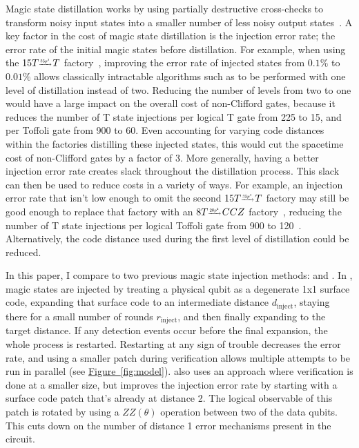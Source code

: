 \documentclass[onecolumn,unpublished,a4paper]{quantumarticle}
\theoremstyle{definition}
\theoremstyle{definition}
\theoremstyle{definition}
\newcommand{\fig}[1]{\hyperref[fig:#1]{Figure~\ref*{fig:#1}}}
\begin{document}
Magic state distillation works by using partially destructive cross-checks to transform noisy input states into a smaller number of less noisy output states~\cite{bravyi2005distillation}.
A key factor in the cost of magic state distillation is the injection error rate; the error rate of the initial magic states before distillation.
For example, when using the $15T \resizebox{!}{8pt}{$\xrightarrow{35p^3}$\,} T$ factory~\cite{bravyi2005distillation}, improving the error rate of injected states from $0.1\%$ to $0.01\%$ allows classically intractable algorithms such as \cite{lee2021hypercontraction,gidney2021factor,soeken2020improved} to be performed with one level of distillation instead of two.
Reducing the number of levels from two to one would have a large impact on the overall cost of non-Clifford gates, because it reduces the number of T state injections per logical T gate from 225 to 15, and per Toffoli gate from 900 to 60.
Even accounting for varying code distances within the factories distilling these injected states, this would cut the spacetime cost of non-Clifford gates by a factor of 3.
More generally, having a better injection error rate creates slack throughout the distillation process.
This slack can then be used to reduce costs in a variety of ways.
For example, an injection error rate that isn't low enough to omit the second $15T \resizebox{!}{8pt}{$\xrightarrow{35p^3}$\,} T$ factory may still be good enough to replace that factory with an $8T \resizebox{!}{8pt}{$\xrightarrow{28p^2}$\,} CCZ$ factory~\cite{jones2013}, reducing the number of T state injections per logical Toffoli gate from 900 to 120~\cite{gidney2019catalyzeddistillation}.
Alternatively, the code distance used during the first level of distillation could be reduced.

In this paper, I compare to two previous magic state injection methods: \cite{li2015injection} and \cite{singh2022injection}.
In \cite{li2015injection}, magic states are injected by treating a physical qubit as a degenerate 1x1 surface code, expanding that surface code to an intermediate distance $d_\text{inject}$, staying there for a small number of rounds $r_\text{inject}$, and then finally expanding to the target distance.
If any detection events occur before the final expansion, the whole process is restarted.
Restarting at any sign of trouble decreases the error rate, and using a smaller patch during verification allows multiple attempts to be run in parallel (see \fig{model}).
\cite{singh2022injection} also uses an approach where verification is done at a smaller size, but improves the injection error rate by starting with a surface code patch that's already at distance 2.
The logical observable of this patch is rotated by using a $ZZ(\theta)$ operation between two of the data qubits.
This cuts down on the number of distance 1 error mechanisms present in the circuit.
\end{document}
